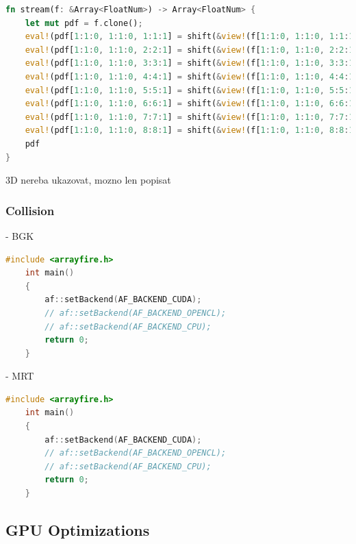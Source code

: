 \begin{lstlisting}[language=Rust, caption=Streaming with \texttt{shift} function for two dimensions with 9 discrete speeds (D2Q9)., label=rust-streaming-2d]
fn stream(f: &Array<FloatNum>) -> Array<FloatNum> {
	let mut pdf = f.clone();
	eval!(pdf[1:1:0, 1:1:0, 1:1:1] = shift(&view!(f[1:1:0, 1:1:0, 1:1:1]), &[1, 0, 0, 0]));
	eval!(pdf[1:1:0, 1:1:0, 2:2:1] = shift(&view!(f[1:1:0, 1:1:0, 2:2:1]), &[0, 1, 0, 0]));
	eval!(pdf[1:1:0, 1:1:0, 3:3:1] = shift(&view!(f[1:1:0, 1:1:0, 3:3:1]), &[-1, 0, 0, 0]));
	eval!(pdf[1:1:0, 1:1:0, 4:4:1] = shift(&view!(f[1:1:0, 1:1:0, 4:4:1]), &[0, -1, 0, 0]));
	eval!(pdf[1:1:0, 1:1:0, 5:5:1] = shift(&view!(f[1:1:0, 1:1:0, 5:5:1]), &[1, 1, 0, 0]));
	eval!(pdf[1:1:0, 1:1:0, 6:6:1] = shift(&view!(f[1:1:0, 1:1:0, 6:6:1]), &[-1, 1, 0, 0]));
	eval!(pdf[1:1:0, 1:1:0, 7:7:1] = shift(&view!(f[1:1:0, 1:1:0, 7:7:1]), &[-1, -1, 0, 0]));
	eval!(pdf[1:1:0, 1:1:0, 8:8:1] = shift(&view!(f[1:1:0, 1:1:0, 8:8:1]), &[1, -1, 0, 0]));
	pdf
}
\end{lstlisting}


3D nereba ukazovat, mozno len popisat \\


\subsubsection{Collision}



- BGK \\

\begin{lstlisting}[language=Cpp, caption=C++ code for setting different computing backends., label=cpp-backends]
	#include <arrayfire.h>
	int main()
	{
		af::setBackend(AF_BACKEND_CUDA);
		// af::setBackend(AF_BACKEND_OPENCL);
		// af::setBackend(AF_BACKEND_CPU);
		return 0;
	}
\end{lstlisting}

- MRT \\

\begin{lstlisting}[language=Cpp, caption=C++ code for setting different computing backends., label=cpp-backends]
	#include <arrayfire.h>
	int main()
	{
		af::setBackend(AF_BACKEND_CUDA);
		// af::setBackend(AF_BACKEND_OPENCL);
		// af::setBackend(AF_BACKEND_CPU);
		return 0;
	}
\end{lstlisting}


\subsection{GPU Optimizations}
\label{optimizations-for-gpu}

